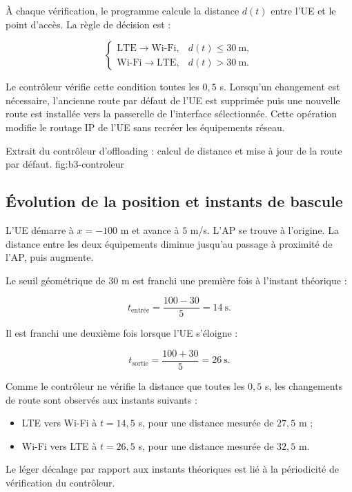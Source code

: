 À chaque vérification, le programme calcule la distance
$d(t)$ entre l'UE et le point d'accès. La règle de décision
est :

\[
\begin{cases}
\text{LTE} \rightarrow \text{Wi-Fi}, & d(t)\leq 30\ \text{m},\\
\text{Wi-Fi} \rightarrow \text{LTE}, & d(t)>30\ \text{m}.
\end{cases}
\]

Le contrôleur vérifie cette condition toutes les $0,5$ s.
Lorsqu'un changement est nécessaire, l'ancienne route
par défaut de l'UE est supprimée puis une nouvelle route
est installée vers la passerelle de l'interface sélectionnée.
Cette opération modifie le routage IP de l'UE sans recréer
les équipements réseau.

{Extrait du contrôleur d'offloading : calcul de distance et mise à jour de la route par défaut.}
{fig:b3-controleur}

\subsection{Évolution de la position et instants de bascule}

L'UE démarre à $x=-100$ m et avance à $5$ m/s. L'AP se
trouve à l'origine. La distance entre les deux équipements
diminue jusqu'au passage à proximité de l'AP, puis augmente.

Le seuil géométrique de $30$ m est franchi une première
fois à l'instant théorique :

\[
t_{\mathrm{entrée}}
=
\frac{100-30}{5}
=
14\ \text{s}.
\]

Il est franchi une deuxième fois lorsque l'UE s'éloigne :

\[
t_{\mathrm{sortie}}
=
\frac{100+30}{5}
=
26\ \text{s}.
\]

Comme le contrôleur ne vérifie la distance que toutes
les $0,5$ s, les changements de route sont observés
aux instants suivants :

\begin{itemize}
    \item LTE vers Wi-Fi à $t=14,5$ s, pour une distance
    mesurée de $27,5$ m ;
    \item Wi-Fi vers LTE à $t=26,5$ s, pour une distance
    mesurée de $32,5$ m.
\end{itemize}

Le léger décalage par rapport aux instants théoriques
est lié à la périodicité de vérification du contrôleur.

